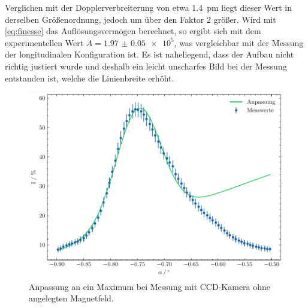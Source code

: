 Verglichen mit der Dopplerverbreiterung von etwa \SI{1.4}{\pm} liegt dieser Wert in derselben Größenordnung,
jedoch um über den Faktor 2 größer. Wird mit \cref{eq:finesse} das Auflösungsvermögen berechnet, 
so ergibt sich mit dem experimentellen Wert $A = \num{1.97(5)e5}$, was vergleichbar mit der Messung 
der longitudinalen Konfiguration ist. Es ist naheliegend, dass der Aufbau nicht richtig justiert wurde
und deshalb ein leicht unscharfes Bild bei der Messung entstanden ist, welche die Linienbreite erhöht.

\begin{figure}[h]
    \centering
    \includegraphics[width=0.5\linewidth]{../figs/doppler}
    \caption{Anpassung an ein Maximum bei Messung mit CCD-Kamera ohne angelegten Magnetfeld.}
    \label{fig:doppler}
\end{figure}

